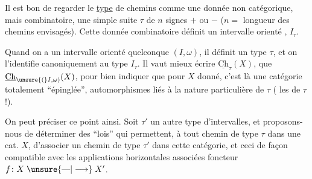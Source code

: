 
Il est bon de regarder  le \uline{type} de chemins comme une donnée  non catégorique, mais combinatoire, une simple suite $\tau$ de $n$ signes  $+$ ou $-$ ($n={}$ longueur des chemins envisagés).  Cette donnée combinatoire définit un intervalle orienté ,  $I_\tau$.

Quand on a un intervalle orienté quelconque $(I,\omega)$, il définit un type $\tau$, et on l'identifie canoniquement au type $I_\tau$. Il  vaut mieux écrire $\underline{\mathrm{Ch}}_\tau(X)$,  que $\underline{\mathrm{Ch}}_{\unsure{(}I,\omega)}(X)$, pour bien indiquer que pour $X$ donné, c'est là une catégorie totalement ``épinglée'',  automorphismes liés à la nature particulière de $\tau$ ( les  de $\tau$ !).

On peut préciser ce point ainsi. Soit $\tau'$ un autre type d'intervalles, et proposons-nous de déterminer des  ``lois'' qui permettent, à tout  chemin de type $\tau$ dans une cat.  $X$, d'associer un chemin de type $\tau'$ dans cette  catégorie, et ceci de façon  compatible avec les  applications horizontales
associées   foncteur $f\colon X\mathrel{\unsure{\text{---}|\longrightarrow}}X'$.
